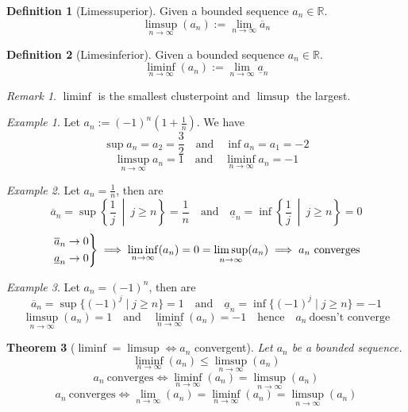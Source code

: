 \documentclass[english,titlepage]{uzhpub}
\theoremstyle{definition}
\newtheorem{definition}{Definition}[section]
\theoremstyle{plain}
\newtheorem{theorem}[definition]{Theorem} %
\theoremstyle{remark}
\newtheorem*{remark}{Remark}
\theoremstyle{example}
\newtheorem*{example}{Example}
\begin{document}
   \begin{definition}[Limessuperior]
      Given a bounded sequence \(a_n \in \mathbb{R}\).
      \[\limsup_{n \to \infty}(a_n) := \lim_{n \to \infty} \overline{a}_n\]
   \end{definition}
   \begin{definition}[Limesinferior]
      Given a bounded sequence \(a_n \in \mathbb{R}\).
      \[\liminf_{n \to \infty}(a_n) := \lim_{n \to \infty} \underline{a}_n\]
   \end{definition}
   \begin{remark}
      \(\liminf\) is the smallest clusterpoint and \(\limsup\) the largest.
   \end{remark}
   \begin{example}
      Let \(a_n := (-1)^n \left(1 + \frac{1}{n}\right)\).
      We have
      \[\sup a_n = a_2 = \frac{3}{2} \quad\text{and}\quad \inf a_n = a_1 = -2\]
      \[\limsup_{n \to \infty} a_n = 1 \quad\text{and}\quad \liminf_{n \to \infty} a_n = -1\]
   \end{example}
   \begin{example}
      Let \(a_n = \frac{1}{n}\), then are
      \[\overline{a}_n = \sup\left\{\frac{1}{j}~\middle|~j \geq n\right\} = \frac{1}{n} \quad\text{and}\quad \underline{a}_n = \inf\left\{\frac{1}{j}~\middle|~j \geq n\right\} = 0\]
      \[\begin{drcases}
         \overline{a}_n \to 0\\
         \underline{a}_n \to 0
      \end{drcases} \implies \liminf_{n \to \infty}(a_n) = 0 = \limsup_{n \to \infty}(a_n) \implies a_n~\text{converges}\]
   \end{example}
   \begin{example}
      Let \(a_n = (-1)^n\), then are 
      \[\overline{a}_n = \sup\{(-1)^j \mid j \geq n\} = 1 \quad\text{and}\quad \underline{a}_n = \inf\{(-1)^j \mid j \geq n\} = -1\]
      \[\limsup_{n \to \infty}(a_n) = 1 \quad\text{and}\quad \liminf_{n \to \infty}(a_n) = -1 \quad\text{hence}\quad a_n~\text{doesn't converge}\]
   \end{example}

   \begin{theorem}[\(\liminf = \limsup \iff a_n\) convergent]\label{thm:limsup_inf_rules}
      Let \(a_n\) be a bounded sequence.
      \begin{equation}\label{eq:inf<sup}
         \liminf_{n \to \infty}(a_n) \leq \limsup_{n \to \infty}(a_n)
      \end{equation}
      \begin{equation}\label{eq:liminf=limsup}
         a_n~\text{converges} \iff \liminf_{n \to \infty}(a_n) = \limsup_{n \to \infty}(a_n)
      \end{equation}
      \begin{equation}\label{eq:liman=limsup=liminf}
         a_n~\text{converges} \iff \lim_{n \to \infty}(a_n) = \liminf_{n \to \infty}(a_n) = \limsup_{n \to \infty}(a_n)
      \end{equation}
   \end{theorem}
\end{document}
